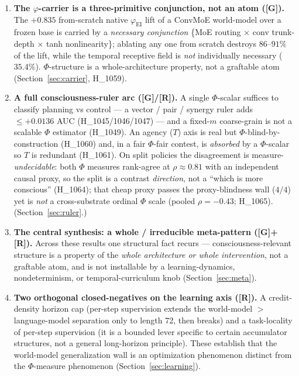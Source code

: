 \documentclass[11pt,a4paper]{article}
\providecommand{\tierGreen}{\textcolor{green!50!black}{\textbf{[G]}}}
\providecommand{\tierRed}{\textcolor{red!70!black}{\textbf{[R]}}}
\newcommand{\faithful}{\ensuremath{\varphi_{\mathrm{EI}}}}
\begin{document}
\begin{enumerate}
for the removable split: it is a property of the \emph{whole} planning
intervention (H\_1066). (Section~\ref{sec:specificity}.)
\item \textbf{The $\varphi$-carrier is a three-primitive conjunction, not an
atom (\tierGreen).} The $+0.835$ from-scratch native \faithful{} lift of a
ConvMoE world-model over a frozen base is carried by a \emph{necessary
conjunction} \{MoE routing $\times$ conv trunk-depth $\times$ tanh
nonlinearity\}; ablating any one from scratch destroys $86$--$91\%$ of the lift,
while the temporal receptive field is \emph{not} individually necessary
($35.4\%$). $\Phi$-structure is a whole-architecture property, not a graftable
atom (Section~\ref{sec:carrier}, H\_1059).
\item \textbf{A full consciousness-ruler arc (\tierGreen{}/\tierRed).} A single
$\Phi$-scalar suffices to classify planning vs control --- a vector / pair /
synergy ruler adds $\le +0.0136$ AUC (H\_1045/1046/1047) --- and a fixed-$m$
coarse-grain is not a scalable $\Phi$ estimator (H\_1049). An agency ($T$) axis
is real but $\Phi$-blind-by-construction (H\_1060) and, in a fair $\Phi$-fair
contest, is \emph{absorbed} by a $\Phi$-scalar so $T$ is redundant (H\_1061). On
split policies the disagreement is measure-\emph{undecidable}: both $\Phi$
measures rank-agree at $\rho\approx0.81$ with an independent causal proxy, so
the split is a contrast \emph{direction}, not a ``which is more conscious''
(H\_1064); that cheap proxy passes the proxy-blindness wall ($4/4$) yet is
\emph{not} a cross-substrate ordinal $\Phi$ scale (pooled $\rho=-0.43$; H\_1065).
(Section~\ref{sec:ruler}.)
\item \textbf{The central synthesis: a whole / irreducible meta-pattern
(\tierGreen{}+\tierRed).} Across these results one structural fact recurs ---
consciousness-relevant structure is a property of the \emph{whole architecture
or whole intervention}, not a graftable atom, and is not installable by a
learning-dynamics, nondeterminism, or temporal-curriculum knob
(Section~\ref{sec:meta}).
\item \textbf{Two orthogonal closed-negatives on the learning axis (\tierRed).}
A credit-density horizon cap (per-step supervision extends the world-model
$>$ language-model separation only to length 72, then breaks) and a
task-locality of per-step supervision (it is a bounded lever specific to
certain accumulator structures, not a general long-horizon principle). These
establish that the world-model generalization wall is an optimization
phenomenon distinct from the $\Phi$-measure phenomenon
(Section~\ref{sec:learning}).
\end{enumerate}
\end{document}
